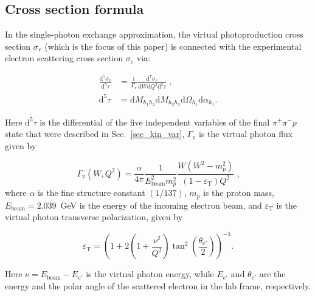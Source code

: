 \documentclass[prc,twocolumn,superscriptaddress,showpacs,amssymb,amsmath,amsfonts,aps,nofootinbib]{revtex4-1}
\begin{document}
\subsection{Cross section formula}
\label{cr_sect_formula}


In the single-photon exchange approximation, the virtual photoproduction cross section $\sigma_{\text{v}}$ (which is the focus of this paper) is connected with the experimental electron scattering cross section $\sigma_{e}$ via: 

\begin{equation}
\begin{aligned}
\frac{\textrm{d}^{5}\sigma_{\text{v}}}{\textrm{d}^{5}\tau} & = \frac{1}{\Gamma_{\text{v}}}
\frac{\textrm{d}^{7}\sigma_{e}}{\textrm{d}W\textrm{d}Q^{2}\textrm{d}^{5}\tau} \textrm{ ,} \\
\textrm{d}^{5}\tau & = \textrm{d}M_{h_{1}h_{2}}\textrm{d}M_{h_{2}h_{3}}\textrm{d}\Omega_{h_{1}}
\textrm{d}\alpha_{h_{1}} \textrm{.}
\label{fulldiff}
\end {aligned}
\end{equation}

Here $\textrm{d}^{5}\tau$ is the differential of the five independent variables of the final $\pi^{+}\pi^{-}p$ state that were described in Sec.~\ref{sec_kin_var}, $\Gamma_{\text{v}}$ is the 
virtual photon flux given by

\begin{equation}
\Gamma_{\text{v}}(W,Q^{2}) =
\frac{\alpha}{4\pi}\frac{1}{E_{\text{beam}}^{2}m_{p}^{2}}\frac{W(W^{2}-m_{p}^{2})}
{(1-\varepsilon_{\text{T}})Q^{2}} \textrm{ ,}
\label{flux}
\end{equation}
where $\alpha$ is the fine structure constant $\left(1/137\right)$, $m_{p}$ is the proton
mass, $E_{\text{beam}} = 2.039$~GeV is the energy of the incoming electron beam, and $\varepsilon_{\text{T}}$ is the virtual photon transverse polarization, given by

\begin{equation}
\varepsilon_{\text{T}} = \left( 1 + 2\left( 1 +
\frac{\nu^{2}}{Q^{2}} \right)
\tan^{2}\left(\frac{\theta_{e'}}{2}\right) \right)^{-1} \textrm{.}
\label{polarization}
\end{equation}

Here $\nu = E_\text{{beam}} - E_{e'}$ is the virtual photon energy, while $E_{e'}$ and
$\theta_{e'}$ are the energy and the polar angle of the scattered electron in the
lab frame, respectively. 
\end{document}
